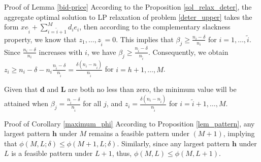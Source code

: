 \begin{pf}{Proof of Lemma \ref{bid-price}}
According to the Proposition \ref{sol_relax_deter}, the aggregate optimal solution to LP relaxation of problem \eqref{deter_upper} takes the form $x e_{\tilde{i}} + \sum_{i=\tilde{i}+1} ^{M} d_{i} e_{i}$, then according to the complementary slackness property, we know that $z_1, \ldots, z_{\tilde{i}} = 0$. This implies that $\beta_j \geq \frac{n_i - \delta}{n_i}$ for $i = 1,\ldots, \tilde{i}$. Since $\frac{n_i - \delta}{n_i}$ increases with $i$, we have $\beta_j \geq \frac{n_{\tilde{i}} - \delta}{n_{\tilde{i}}}$. Consequently, we obtain $z_{i} \geq n_i - \delta - n_i \frac{n_{\tilde{i}} - \delta}{n_{\tilde{i}}} = \frac{\delta(n_i-n_{\tilde{i}})}{n_{\tilde{i}}}$ for $i = h+1, \ldots, M$.
  
Given that $\mathbf{d}$ and $\mathbf{L}$ are both no less than zero, the minimum value will be attained when $\beta_j = \frac{n_{\tilde{i}} - \delta}{n_{\tilde{i}}}$ for all $j$, and $z_i = \frac{\delta(n_i-n_{\tilde{i}})}{n_{\tilde{i}}}$ for $i = \tilde{i}+1, \ldots, M$.  
\end{pf}

\begin{pf}{Proof of Corollary \ref{maximum_phi}}
  According to Proposition \ref{lem_pattern}, any largest pattern $\bm{h}$ under $M$ remains a feasible pattern under $(M+1)$, implying that $\phi(M, L;\delta) \leq \phi(M+1, L; \delta)$. Similarly, since any largest pattern $\bm{h}$ under $L$ is a feasible pattern under $L+1$, thus, $\phi(M, L) \leq \phi(M, L+1)$.
\end{pf}
 



\newpage
